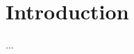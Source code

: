 \documentclass[twocolumn]{aastex7}
\begin{document}
\keywords{}


\section{Introduction} \label{sec:introduction}

...
\end{document}
